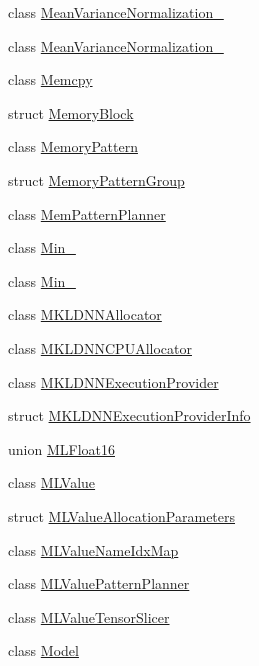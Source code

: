 \begin{DoxyCompactItemize}
class \mbox{\hyperlink{classonnxruntime_1_1MeanVarianceNormalization__0}{Mean\+Variance\+Normalization\+\_}}
\item 
class \mbox{\hyperlink{classonnxruntime_1_1MeanVarianceNormalization__1}{Mean\+Variance\+Normalization\+\_}}
\item 
class \mbox{\hyperlink{classonnxruntime_1_1Memcpy}{Memcpy}}
\item 
struct \mbox{\hyperlink{structonnxruntime_1_1MemoryBlock}{Memory\+Block}}
\item 
class \mbox{\hyperlink{classonnxruntime_1_1MemoryPattern}{Memory\+Pattern}}
\item 
struct \mbox{\hyperlink{structonnxruntime_1_1MemoryPatternGroup}{Memory\+Pattern\+Group}}
\item 
class \mbox{\hyperlink{classonnxruntime_1_1MemPatternPlanner}{Mem\+Pattern\+Planner}}
\item 
class \mbox{\hyperlink{classonnxruntime_1_1Min__6}{Min\+\_}}
\item 
class \mbox{\hyperlink{classonnxruntime_1_1Min__8}{Min\+\_}}
\item 
class \mbox{\hyperlink{classonnxruntime_1_1MKLDNNAllocator}{M\+K\+L\+D\+N\+N\+Allocator}}
\item 
class \mbox{\hyperlink{classonnxruntime_1_1MKLDNNCPUAllocator}{M\+K\+L\+D\+N\+N\+C\+P\+U\+Allocator}}
\item 
class \mbox{\hyperlink{classonnxruntime_1_1MKLDNNExecutionProvider}{M\+K\+L\+D\+N\+N\+Execution\+Provider}}
\item 
struct \mbox{\hyperlink{structonnxruntime_1_1MKLDNNExecutionProviderInfo}{M\+K\+L\+D\+N\+N\+Execution\+Provider\+Info}}
\item 
union \mbox{\hyperlink{uniononnxruntime_1_1MLFloat16}{M\+L\+Float16}}
\item 
class \mbox{\hyperlink{classonnxruntime_1_1MLValue}{M\+L\+Value}}
\item 
struct \mbox{\hyperlink{structonnxruntime_1_1MLValueAllocationParameters}{M\+L\+Value\+Allocation\+Parameters}}
\item 
class \mbox{\hyperlink{classonnxruntime_1_1MLValueNameIdxMap}{M\+L\+Value\+Name\+Idx\+Map}}
\item 
class \mbox{\hyperlink{classonnxruntime_1_1MLValuePatternPlanner}{M\+L\+Value\+Pattern\+Planner}}
\item 
class \mbox{\hyperlink{classonnxruntime_1_1MLValueTensorSlicer}{M\+L\+Value\+Tensor\+Slicer}}
\item 
class \mbox{\hyperlink{classonnxruntime_1_1Model}{Model}}

\end{DoxyCompactItemize}
